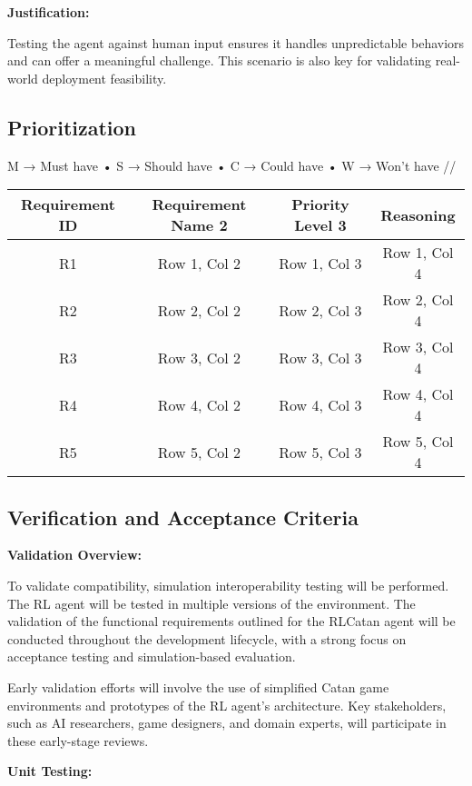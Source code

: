 \documentclass{article}
\begin{document}
\noindent\textbf{Justification:}

Testing the agent against human input ensures it handles unpredictable behaviors and can offer a meaningful challenge. This scenario is also key for validating real-world deployment feasibility.



\subsection{Prioritization}\label{subsec:prioritization}
M → Must have
• S → Should have
• C → Could have
• W → Won't have //

\begin{tabular}{|c|c|c|c|}
\hline
Requirement ID & Requirement Name 2 & Priority Level 3 & Reasoning \\
\hline
R1 & Row 1, Col 2 & Row 1, Col 3 & Row 1, Col 4 \\
\hline
R2 & Row 2, Col 2 & Row 2, Col 3 & Row 2, Col 4 \\
\hline
R3 & Row 3, Col 2 & Row 3, Col 3 & Row 3, Col 4 \\
\hline
R4 & Row 4, Col 2 & Row 4, Col 3 & Row 4, Col 4 \\
\hline
R5 & Row 5, Col 2 & Row 5, Col 3 & Row 5, Col 4 \\
\hline
\end{tabular}


\subsection{Verification and Acceptance Criteria}\label{subsec:verification-and-acceptance-criteria}

\noindent\textbf{Validation Overview:}

To validate compatibility, simulation interoperability testing will be performed. The RL agent will be tested in multiple versions of the environment. The validation of the functional requirements outlined for the RLCatan agent will be conducted throughout the development lifecycle, with a strong focus on acceptance testing and simulation-based evaluation.

Early validation efforts will involve the use of simplified Catan game environments and prototypes of the RL agent's architecture. Key stakeholders, such as AI researchers, game designers, and domain experts, will participate in these early-stage reviews.

\noindent\textbf{Unit Testing:}
\end{document}
